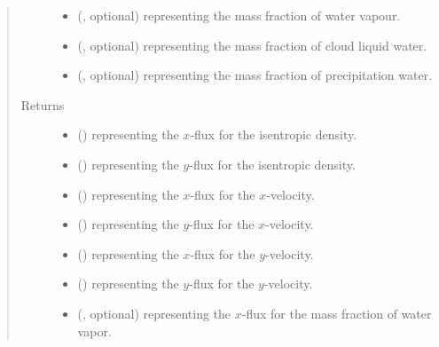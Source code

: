 \documentclass[letterpaper,10pt,english]{sphinxmanual}
\begin{document}
\begin{fulllineitems}
\begin{fulllineitems}
\begin{quote}
\begin{description}
\begin{itemize}
\item {} 
 (, optional) \textendash{}  representing the mass fraction of water vapour.

\item {} 
 (, optional) \textendash{}  representing the mass fraction of cloud liquid water.

\item {} 
 (, optional) \textendash{}  representing the mass fraction of precipitation water.

\end{itemize}

\item[{Returns}] \leavevmode
\begin{itemize}
\item {} 
 () \textendash{}  representing the \(x\)-flux for the isentropic density.

\item {} 
 () \textendash{}  representing the \(y\)-flux for the isentropic density.

\item {} 
 () \textendash{}  representing the \(x\)-flux for the \(x\)-velocity.

\item {} 
 () \textendash{}  representing the \(y\)-flux for the \(x\)-velocity.

\item {} 
 () \textendash{}  representing the \(x\)-flux for the \(y\)-velocity.

\item {} 
 () \textendash{}  representing the \(y\)-flux for the \(y\)-velocity.

\item {} 
 (, optional) \textendash{}  representing the \(x\)-flux for the mass fraction of water vapor.


\end{itemize}
\end{description}
\end{quote}
\end{fulllineitems}
\end{fulllineitems}
\end{document}
